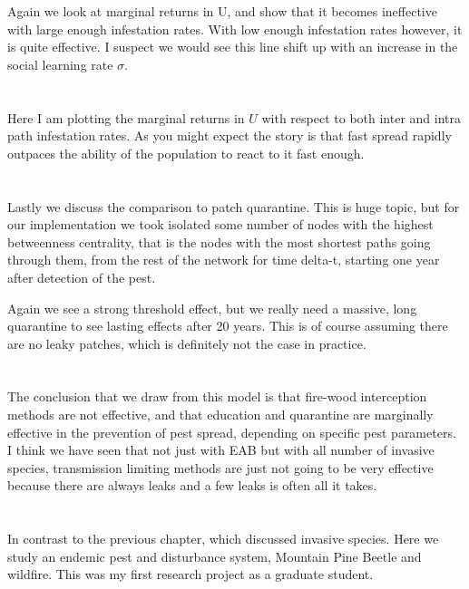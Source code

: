 \documentclass{article}
\begin{document}
Again we look at marginal returns in U, and show that it becomes ineffective with large enough infestation rates. With low enough infestation rates however, it is quite effective. I suspect we would see this line shift up with an increase in the social learning rate $\sigma$.

\section{}

Here I am plotting the marginal returns in $U$ with respect to both inter and intra path infestation rates. As you might expect the story is that fast spread rapidly outpaces the ability of the population to react to it fast enough. 

\section{}

Lastly we discuss the comparison to patch quarantine. This is huge topic, but for our implementation we took isolated some number of nodes with the highest betweenness centrality, that is the nodes with the most shortest paths going through them, from the rest of the network for time delta-t, starting one year after detection of the pest.

Again we see a strong threshold effect, but we really need a massive, long quarantine to see lasting effects after 20 years. This is of course assuming there are no leaky patches, which is definitely not the case in practice.

\section{}

The conclusion that we draw from this model is that fire-wood interception methods are not effective, and that education and quarantine are marginally effective in the prevention of pest spread, depending on specific pest parameters. I think we have seen that not just with EAB but with all number of invasive species, transmission limiting methods are just not going to be very effective because there are always leaks and a few leaks is often all it takes. 

\section{}

In contrast to the previous chapter, which discussed invasive species. Here we study an endemic pest and disturbance system, Mountain Pine Beetle and wildfire. This was my first research project as a graduate student.
\end{document}
